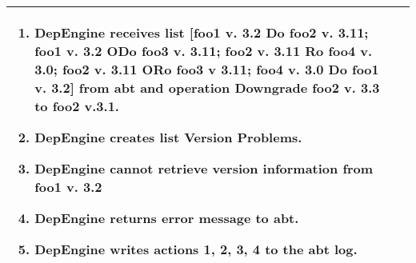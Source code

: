 \begin{tabularx}{\linewidth}{|l|X|}
\begin{minipage}{\linewidth}
  \begin{enumerate}
  \item DepEngine receives list [foo1 v. 3.2 Do foo2 v. 3.11; foo1 v. 3.2 ODo foo3 v. 3.11; foo2 v. 3.11 Ro foo4 v. 3.0; foo2 v. 3.11 ORo foo3 v 3.11; foo4 v. 3.0 Do foo1 v. 3.2] from abt and operation Downgrade foo2 v. 3.3 to foo2 v.3.1.
  \item DepEngine creates list Version Problems.
  \item DepEngine cannot retrieve version information from  foo1 v. 3.2   
  \item DepEngine returns error message to abt.
  \item DepEngine writes actions 1, 2, 3, 4 to the abt log.
    \end{enumerate}
  \vspace{0.05em}
\end{minipage}
\\
\hline 
\end{tabularx}
